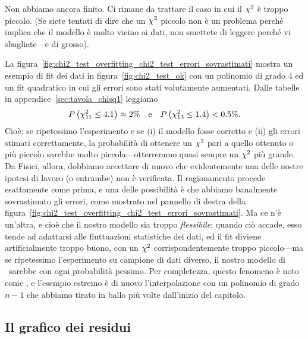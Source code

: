 Non abbiamo ancora finito. Ci rimane da trattare il caso in cui il $\chi^2$
è troppo piccolo. (Se siete tentati di dire che un $\chi^2$ piccolo non è
un problema perché implica che il modello è molto vicino ai dati, non
smettete di leggere perché vi sbagliate---e di grosso).


La figura~\ref{fig:chi2_test_overfitting_chi2_test_errori_sovrastimati} mostra
un esempio di fit dei dati in figura~\ref{fig:chi2_test_ok} con un
polinomio di grado $4$ ed un fit quadratico in cui gli errori sono stati
volutamente aumentati. Dalle tabelle in appendice~\ref{sec:tavola_chisq1}
leggiamo
\begin{align*}
  \displaystyle P\left(\chi^2_{11} \leq 4.1\right) \approx 2\% \quad \text{e} \quad
  \displaystyle P\left(\chi^2_{13} \leq 1.4\right) < 0.5\%.
\end{align*}
Cioè: se ripetessimo l'esperimento e se (i) il modello fosse corretto e (ii)
gli errori stimati correttamente, la probabilità di ottenere un $\chi^2$ pari
a quello ottenuto o più piccolo sarebbe molto piccola---otterremmo quasi
sempre un $\chi^2$ più grande. Da Fisici, allora, dobbiamo accettare di nuovo
che evidentemente una delle nostre ipotesi di lavoro (o entrambe) non è
verificata. Il ragionamento procede esattamente come prima, e una delle
possibilità è che abbiamo banalmente sovrastimato gli errori, come mostrato
nel pannello di destra della
figura~\ref{fig:chi2_test_overfitting_chi2_test_errori_sovrastimati}.
Ma ce n'è un'altra, e cioè che il nostro modello sia troppo
\emph{flessibile}; quando ciò accade, esso tende ad adattarsi alle
fluttuazioni statistiche dei dati, ed il fit diviene artificialmente troppo
buono, con un $\chi^2$ corrispondentemente troppo piccolo---ma se ripetessimo
l'esperimento su campione di dati diverso, il nostro modello di \bestfit\
sarebbe con ogni probabilità pessimo. Per completezza, questo fenomeno è
noto come \foreign{over-fitting}, e l'esempio estremo è di nuovo l'interpolazione
con un polinomio di grado $n - 1$ che abbiamo tirato in ballo più volte
dall'inizio del capitolo.


\subsection{Il grafico dei residui}
\label{sec:grafico_residui}

